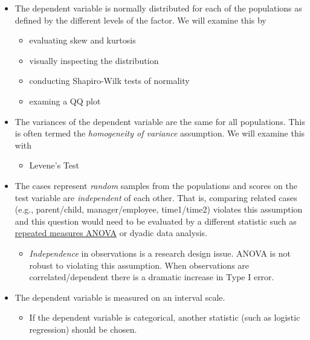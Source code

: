 \documentclass[
  11pt,
]{book}
\providecommand{\tightlist}{%
  \setlength{\itemsep}{0pt}\setlength{\parskip}{0pt}}
\begin{document}
\begin{itemize}
\tightlist
\item
  The dependent variable is normally distributed for each of the populations as defined by the different levels of the factor. We will examine this by

  \begin{itemize}
  \tightlist
  \item
    evaluating skew and kurtosis
  \item
    visually inspecting the distribution
  \item
    conducting Shapiro-Wilk tests of normality
  \item
    examing a QQ plot
  \end{itemize}
\item
  The variances of the dependent variable are the same for all populations. This is often termed the \emph{homogeneity of variance} assumption. We will examine this with

  \begin{itemize}
  \tightlist
  \item
    Levene's Test
  \end{itemize}
\item
  The cases represent \emph{random} samples from the populations and scores on the test variable are \emph{independent} of each other. That is, comparing related cases (e.g., parent/child, manager/employee, time1/time2) violates this assumption and this question would need to be evaluated by a different statistic such as \protect\hyperlink{Repeated}{repeated measures ANOVA} or dyadic data analysis.

  \begin{itemize}
  \tightlist
  \item
    \emph{Independence} in observations is a research design issue. ANOVA is not robust to violating this assumption. When observations are correlated/dependent there is a dramatic increase in Type I error.
  \end{itemize}
\item
  The dependent variable is measured on an interval scale.

  \begin{itemize}
  \tightlist
  \item
    If the dependent variable is categorical, another statistic (such as logistic regression) should be chosen.
  \end{itemize}
\end{itemize}
\end{document}
